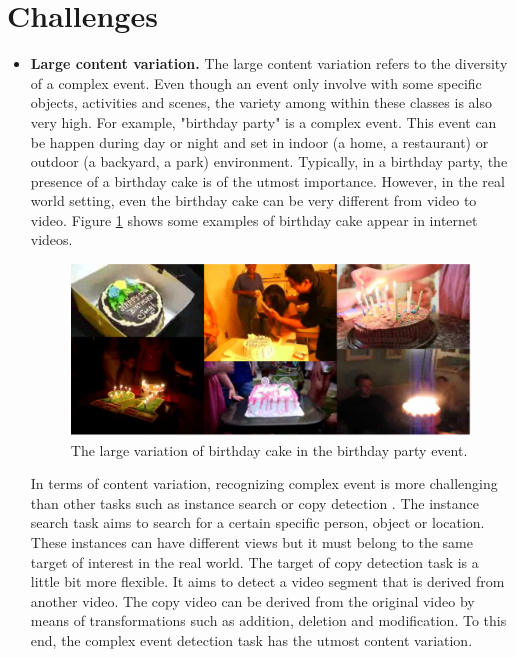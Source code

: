 \section{Challenges}
\label{c1_challenges}
\begin{itemize}
	\item{\textbf{Large content variation.}} The large content variation refers to the diversity of a complex event. Even though an event only involve with some specific objects, activities and scenes, the variety among within these classes is also very high. For example, "birthday party" is a complex event. This event can be happen during day or night and set in indoor (a home, a restaurant) or outdoor (a backyard, a park) environment. Typically, in a birthday party, the presence of a birthday cake is of the utmost importance. However, in the real world setting, even the birthday cake can be very different from video to video. Figure \ref{c1_largecontent} shows some examples of birthday cake appear in internet videos. 
	\begin{figure}
		\centering
		\includegraphics[width=1\textwidth]{largecontent.pdf}
		\caption{The large variation of birthday cake in the birthday party event.}
		\label{c1_largecontent}
	\end{figure}
	
	In terms of content variation, recognizing complex event is more challenging than other tasks such as instance search  or copy detection . The instance search task aims to search for a certain specific person, object or location. These instances can have different views but it must belong to the same target of interest in the real world. The target of copy detection task is a little bit more flexible. It aims to detect a video segment that is derived from another video. The copy video can be derived from the original video by means of transformations such as addition, deletion and modification. To this end, the complex event detection task has the utmost content variation.
	 

\end{itemize}
